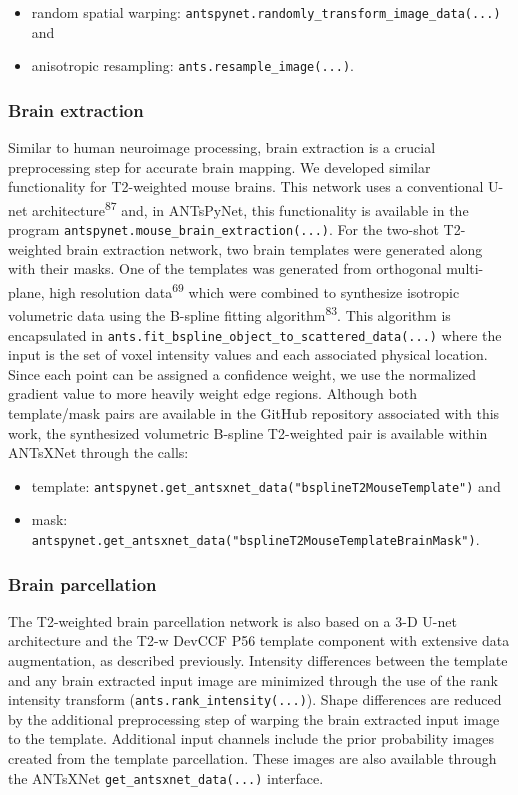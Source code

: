 \documentclass[
  12pt,
]{article}
\begin{document}
\begin{itemize}
\item
  random spatial warping:
  \texttt{antspynet.randomly\_transform\_image\_data(...)} and
\item
  anisotropic resampling: \texttt{ants.resample\_image(...)}.
\end{itemize}

\subsubsection{Brain extraction}\label{brain-extraction}

Similar to human neuroimage processing, brain extraction is a crucial
preprocessing step for accurate brain mapping. We developed similar
functionality for T2-weighted mouse brains. This network uses a
conventional U-net architecture\textsuperscript{87} and, in ANTsPyNet,
this functionality is available in the program
\texttt{antspynet.mouse\_brain\_extraction(...)}. For the two-shot
T2-weighted brain extraction network, two brain templates were generated
along with their masks. One of the templates was generated from
orthogonal multi-plane, high resolution data\textsuperscript{69} which
were combined to synthesize isotropic volumetric data using the B-spline
fitting algorithm\textsuperscript{83}. This algorithm is encapsulated in
\texttt{ants.fit\_bspline\_object\_to\_scattered\_data(...)} where the
input is the set of voxel intensity values and each associated physical
location. Since each point can be assigned a confidence weight, we use
the normalized gradient value to more heavily weight edge regions.
Although both template/mask pairs are available in the GitHub repository
associated with this work, the synthesized volumetric B-spline
T2-weighted pair is available within ANTsXNet through the calls:

\begin{itemize}
\item
  template:
  \texttt{antspynet.get\_antsxnet\_data("bsplineT2MouseTemplate")} and
\item
  mask:
  \texttt{antspynet.get\_antsxnet\_data("bsplineT2MouseTemplateBrainMask")}.
\end{itemize}

\subsubsection{Brain parcellation}\label{brain-parcellation}

The T2-weighted brain parcellation network is also based on a 3-D U-net
architecture and the T2-w DevCCF P56 template component with extensive
data augmentation, as described previously. Intensity differences
between the template and any brain extracted input image are minimized
through the use of the rank intensity transform
(\texttt{ants.rank\_intensity(...)}). Shape differences are reduced by
the additional preprocessing step of warping the brain extracted input
image to the template. Additional input channels include the prior
probability images created from the template parcellation. These images
are also available through the ANTsXNet
\texttt{get\_antsxnet\_data(...)} interface.
\end{document}

